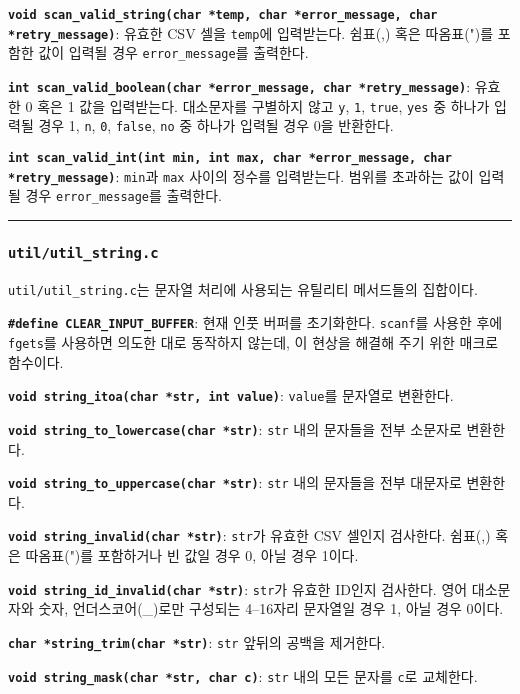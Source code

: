 \documentclass[runningheads]{llncs}
\begin{document}
\textbf{\texttt{void scan_valid_string(char *temp, char *error_message, char *retry_message)}}: 유효한 CSV 셀을 \texttt{temp}에 입력받는다. 쉼표(,) 혹은 따옴표(")를 포함한 값이 입력될 경우 \texttt{error_message}를 출력한다.

\textbf{\texttt{int scan_valid_boolean(char *error_message, char *retry_message)}}: 유효한 0 혹은 1 값을 입력받는다. 대소문자를 구별하지 않고 \texttt{y}, \texttt{1}, \texttt{true}, \texttt{yes} 중 하나가 입력될 경우 1, \texttt{n}, \texttt{0}, \texttt{false}, \texttt{no} 중 하나가 입력될 경우 0을 반환한다.

\textbf{\texttt{int scan_valid_int(int min, int max, char *error_message, char *retry_message)}}: \texttt{min}과 \texttt{max} 사이의 정수를 입력받는다. 범위를 초과하는 값이 입력될 경우 \texttt{error_message}를 출력한다.

\noindent\rule{2cm}{0.4pt}

\subsubsection{\texttt{util/util_string.c}}
\texttt{util/util_string.c}는 문자열 처리에 사용되는 유틸리티 메서드들의 집합이다.

\textbf{\texttt{\#define CLEAR_INPUT_BUFFER}}: 현재 인풋 버퍼를 초기화한다. \texttt{scanf}를 사용한 후에 \texttt{fgets}를 사용하면 의도한 대로 동작하지 않는데, 이 현상을 해결해 주기 위한 매크로 함수이다.

\textbf{\texttt{void string_itoa(char *str, int value)}}: \texttt{value}를 문자열로 변환한다.

\textbf{\texttt{void string_to_lowercase(char *str)}}: \texttt{str} 내의 문자들을 전부 소문자로 변환한다.

\textbf{\texttt{void string_to_uppercase(char *str)}}: \texttt{str} 내의 문자들을 전부 대문자로 변환한다.

\textbf{\texttt{void string_invalid(char *str)}}: \texttt{str}가 유효한 CSV 셀인지 검사한다. 쉼표(,) 혹은 따옴표(")를 포함하거나 빈 값일 경우 0, 아닐 경우 1이다.

\textbf{\texttt{void string_id_invalid(char *str)}}: \texttt{str}가 유효한 ID인지 검사한다. 영어 대소문자와 숫자, 언더스코어(_)로만 구성되는 4--16자리 문자열일 경우 1, 아닐 경우 0이다.

\textbf{\texttt{char *string_trim(char *str)}}: \texttt{str} 앞뒤의 공백을 제거한다.

\textbf{\texttt{void string_mask(char *str, char c)}}: \texttt{str} 내의 모든 문자를 \texttt{c}로 교체한다.
\end{document}
